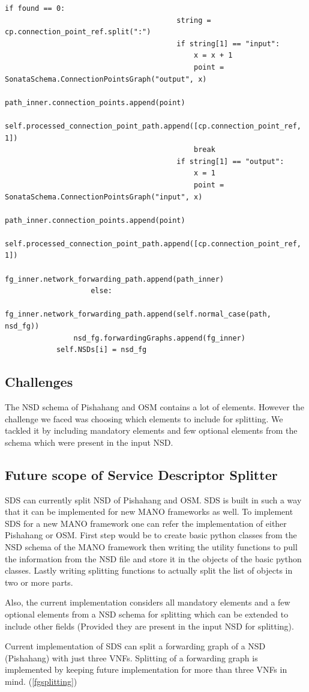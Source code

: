 \begin{lstlisting}[caption=Forwarding Graph Splitting, label=lis:FGSplitting]
                                    if found == 0:
                                        string = cp.connection_point_ref.split(":")
                                        if string[1] == "input":
                                            x = x + 1
                                            point = SonataSchema.ConnectionPointsGraph("output", x)
                                            path_inner.connection_points.append(point)
                                            self.processed_connection_point_path.append([cp.connection_point_ref, 1])
                                            break
                                        if string[1] == "output":
                                            x = 1
                                            point = SonataSchema.ConnectionPointsGraph("input", x)
                                            path_inner.connection_points.append(point)
                                            self.processed_connection_point_path.append([cp.connection_point_ref, 1])
                            fg_inner.network_forwarding_path.append(path_inner)
                    else:
                        fg_inner.network_forwarding_path.append(self.normal_case(path, nsd_fg))
                nsd_fg.forwardingGraphs.append(fg_inner)
            self.NSDs[i] = nsd_fg

\end{lstlisting}

\subsection{Challenges}
The NSD schema of Pishahang and OSM contains a lot of elements. However the challenge we faced was choosing which elements to include for splitting. We tackled it by including mandatory elements and few optional elements from the schema which were present in the input NSD.
\subsection{Future scope of Service Descriptor Splitter}
SDS can currently split NSD of Pishahang and OSM. SDS is built in such a way that it can be implemented for new MANO frameworks as well. To implement SDS for a new MANO framework one can refer the implementation of either Pishahang or OSM. First step would be to create basic python classes from the NSD schema of the MANO framework then writing the utility functions to pull the information from the NSD file and store it in the objects of the basic python classes. Lastly writing splitting functions to actually split the list of objects in two or more parts.

Also, the current implementation considers all mandatory elements and a few optional elements from a NSD schema for splitting which can be extended to include other fields (Provided they are present in the input NSD for splitting).

Current implementation of SDS can split a forwarding graph of a NSD (Pishahang) with just three VNFs. Splitting of a forwarding graph is implemented by keeping future implementation for more than three VNFs in mind. (\ref{fgsplitting})
